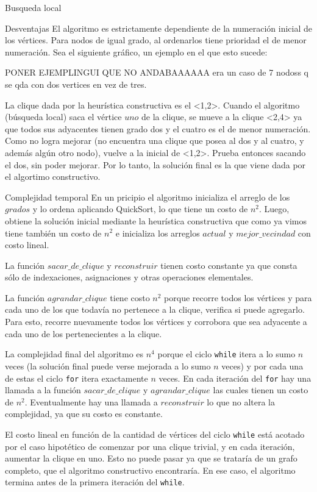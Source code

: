 \begin{section}{Busqueda local}
\begin{subsection}{Desventajas}
		El algoritmo es estrictamente dependiente de la numeración inicial de los vértices. Para nodos de igual grado, al ordenarlos tiene prioridad el de menor numeración.
		Sea el siguiente gráfico, un ejemplo en el que esto sucede:
		
		
		PONER EJEMPLINGUI QUE NO ANDABAAAAAA era un caso de 7 nodoss q se qda con dos vertices en vez de tres.


		La clique dada por la heurística constructiva es el <1,2>.
		Cuando el algoritmo (búsqueda local) saca el vértice $uno$ de la clique, se mueve a la clique <2,4> ya que todos sus adyacentes tienen grado dos y el cuatro es el de menor numeración. Como no logra mejorar (no encuentra una clique que posea al dos y al cuatro, y además algún otro nodo), vuelve a la inicial de <1,2>. Prueba entonces sacando el dos, sin poder mejorar. Por lo tanto, la solución final es la que viene dada por el algortimo constructivo.
		
		\end{subsection}
		\begin{subsection}{Complejidad temporal}
			En un pricipio el algoritmo inicializa el arreglo de los $grados$ y lo ordena aplicando QuickSort, lo que tiene un costo de $n^2$. Luego, obtiene la solución inicial mediante la heurística constructiva que como ya vimos tiene también un costo de $n^2$ e inicializa los arreglos $actual$ y $mejor\_vecindad$ con costo lineal.

			La función $sacar\_de\_clique$ y $reconstruir$ tienen costo constante ya que consta sólo de indexaciones, asignaciones y otras operaciones elementales.

			La función $agrandar\_clique$ tiene costo $n^2$ porque recorre todos los vértices y para cada uno de los que todavía no pertenece a la clique, verifica si puede agregarlo. Para esto, recorre nuevamente todos los vértices y corrobora que sea adyacente a cada uno de los pertenecientes a la clique.

			La complejidad final del algoritmo es $n^4$ porque el ciclo \texttt{while} itera a lo sumo $n$ veces (la solución final puede verse mejorada a lo sumo $n$ veces) y por cada una de estas el ciclo \texttt{for} itera exactamente $n$ veces. En cada iteración del \texttt{for} hay una llamada a la función $sacar\_de\_clique$ y $agrandar\_clique$ las cuales tienen un costo de $n^2$. Eventualmente hay una llamada a $reconstruir$ lo que no altera la complejidad, ya que su costo es constante.
			
			El costo lineal en función de la cantidad de vértices del ciclo \texttt{while} está acotado por el caso hipotético de comenzar por una clique trivial, y en cada iteración, aumentar la clique en uno. Esto no puede pasar ya que se trataría de un grafo completo, que el algoritmo constructivo encontraría. En ese caso, el algoritmo termina antes de la primera iteración del \texttt{while}.
		\end{subsection}
\end{section}



